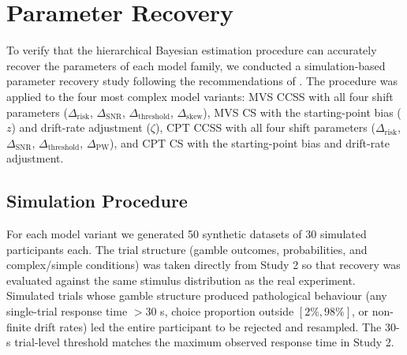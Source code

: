 \documentclass[man,floatsintext]{apa7}
\begin{document}
\section{Parameter Recovery}
\label{sec:recovery}

To verify that the hierarchical Bayesian estimation procedure can accurately recover the parameters of each model family, we conducted a simulation-based parameter recovery study following the recommendations of \textcite{baribault_troubleshooting_2025}. The procedure was applied to the four most complex model variants: MVS CCSS with all four shift parameters ($\Delta_{\text{risk}}$, $\Delta_{\text{SNR}}$, $\Delta_{\text{threshold}}$, $\Delta_{\text{skew}}$), MVS CS with the starting-point bias ($z$) and drift-rate adjustment ($\zeta$), CPT CCSS with all four shift parameters ($\Delta_{\text{risk}}$, $\Delta_{\text{SNR}}$, $\Delta_{\text{threshold}}$, $\Delta_{\text{PW}}$), and CPT CS with the starting-point bias and drift-rate adjustment.

\subsection{Simulation Procedure}

For each model variant we generated 50 synthetic datasets of 30 simulated participants each. The trial structure (gamble outcomes, probabilities, and complex/simple conditions) was taken directly from Study 2 so that recovery was evaluated against the same stimulus distribution as the real experiment. Simulated trials whose gamble structure produced pathological behaviour (any single-trial response time $>30$ s, choice proportion outside $[2\%, 98\%]$, or non-finite drift rates) led the entire participant to be rejected and resampled. The 30-s trial-level threshold matches the maximum observed response time in Study 2.
\end{document}
